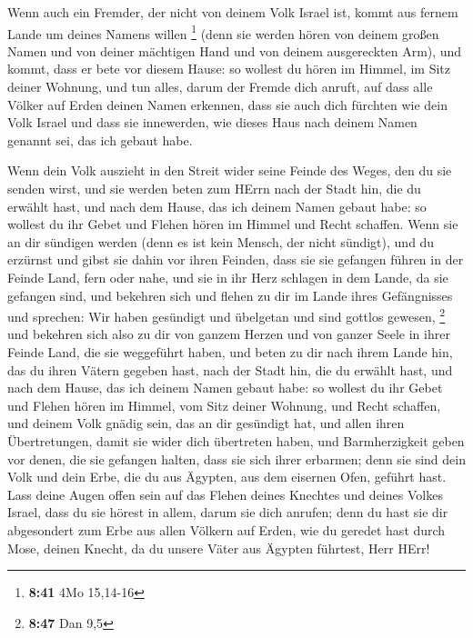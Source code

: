  Wenn auch ein Fremder, der nicht von deinem Volk Israel
ist, kommt aus fernem Lande um deines Namens willen \footnote{\textbf{8:41}
  4Mo 15,14-16}  (denn sie werden hören von deinem großen
Namen und von deiner mächtigen Hand und von deinem ausgereckten Arm),
und kommt, dass er bete vor diesem Hause:  so wollest du
hören im Himmel, im Sitz deiner Wohnung, und tun alles, darum der Fremde
dich anruft, auf dass alle Völker auf Erden deinen Namen erkennen, dass
sie auch dich fürchten wie dein Volk Israel und dass sie innewerden, wie
dieses Haus nach deinem Namen genannt sei, das ich gebaut habe.

 Wenn dein Volk auszieht in den Streit wider seine Feinde
des Weges, den du sie senden wirst, und sie werden beten zum HErrn nach
der Stadt hin, die du erwählt hast, und nach dem Hause, das ich deinem
Namen gebaut habe:  so wollest du ihr Gebet und Flehen
hören im Himmel und Recht schaffen.  Wenn sie an dir
sündigen werden (denn es ist kein Mensch, der nicht sündigt), und du
erzürnst und gibst sie dahin vor ihren Feinden, dass sie sie gefangen
führen in der Feinde Land, fern oder nahe,  und sie in ihr
Herz schlagen in dem Lande, da sie gefangen sind, und bekehren sich und
flehen zu dir im Lande ihres Gefängnisses und sprechen: Wir haben
gesündigt und übelgetan und sind gottlos gewesen, \footnote{\textbf{8:47}
  Dan 9,5}  und bekehren sich also zu dir von ganzem Herzen
und von ganzer Seele in ihrer Feinde Land, die sie weggeführt haben, und
beten zu dir nach ihrem Lande hin, das du ihren Vätern gegeben hast,
nach der Stadt hin, die du erwählt hast, und nach dem Hause, das ich
deinem Namen gebaut habe:  so wollest du ihr Gebet und
Flehen hören im Himmel, vom Sitz deiner Wohnung, und Recht schaffen,
 und deinem Volk gnädig sein, das an dir gesündigt hat, und
allen ihren Übertretungen, damit sie wider dich übertreten haben, und
Barmherzigkeit geben vor denen, die sie gefangen halten, dass sie sich
ihrer erbarmen;  denn sie sind dein Volk und dein Erbe, die
du aus Ägypten, aus dem eisernen Ofen, geführt hast.  Lass
deine Augen offen sein auf das Flehen deines Knechtes und deines Volkes
Israel, dass du sie hörest in allem, darum sie dich anrufen;
 denn du hast sie dir abgesondert zum Erbe aus allen
Völkern auf Erden, wie du geredet hast durch Mose, deinen Knecht, da du
unsere Väter aus Ägypten führtest, Herr HErr!

